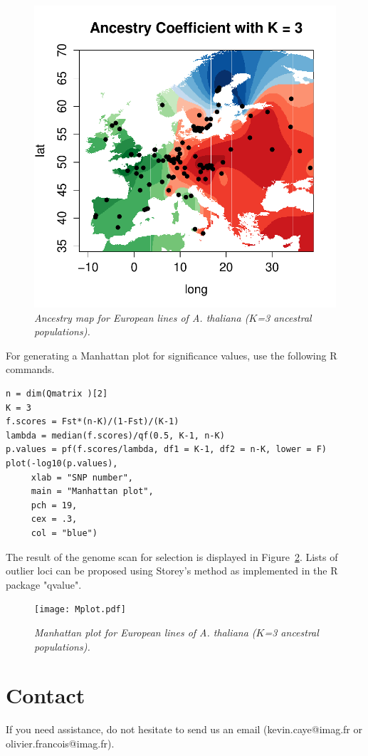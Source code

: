\documentclass[12pt,a4paper]{article}
\begin{document}
\begin{figure}[h!]\centering
\includegraphics[width=\linewidth]{map.pdf}
\caption{\it Ancestry map for European lines of A. thaliana ($K$=3 ancestral populations).}\label{fig:map}
\end{figure} 

For generating a Manhattan plot for significance values, use the following R commands. 
\begin{Verbatim}[frame=single]
n = dim(Qmatrix )[2]
K = 3
f.scores = Fst*(n-K)/(1-Fst)/(K-1)
lambda = median(f.scores)/qf(0.5, K-1, n-K)
p.values = pf(f.scores/lambda, df1 = K-1, df2 = n-K, lower = F)
plot(-log10(p.values), 
     xlab = "SNP number", 
     main = "Manhattan plot", 
     pch = 19, 
     cex = .3, 
     col = "blue")
\end{Verbatim}

The result of the genome scan for selection is displayed in Figure~\ref{fig:Mplot}. 
Lists of outlier loci can be proposed using Storey's method as implemented in the R package "qvalue".


\begin{figure}[h!]\centering
\texttt{[image: Mplot.pdf]}
\caption{\it Manhattan plot for European lines of A. thaliana ($K$=3 ancestral populations).}\label{fig:Mplot}
\end{figure} 

\section{Contact}
If you need assistance, do not hesitate to send us an email (kevin.caye@imag.fr 
or olivier.francois@imag.fr). 



\end{document}
